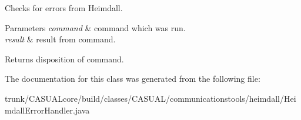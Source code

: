 Checks for errors from Heimdall. 
\begin{DoxyParams}{Parameters}
{\em command} & command which was run. \\
\hline
{\em result} & result from command. \\
\hline
\end{DoxyParams}
\begin{DoxyReturn}{Returns}
disposition of command. 
\end{DoxyReturn}


The documentation for this class was generated from the following file\-:\begin{DoxyCompactItemize}
\item 
trunk/\-C\-A\-S\-U\-A\-Lcore/build/classes/\-C\-A\-S\-U\-A\-L/communicationstools/heimdall/Heimdall\-Error\-Handler.\-java\end{DoxyCompactItemize}
